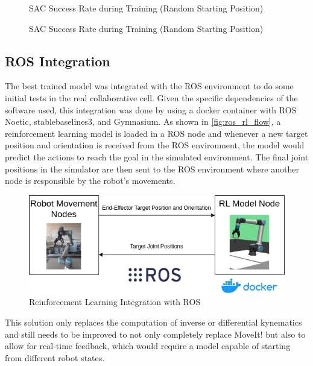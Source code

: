 \begin{figure}[H]%
    \centering
    {\fontsize{8}{11}\selectfont}
    \caption{SAC Success Rate during Training (Random Starting Position)}
    \label{fig:reward_rp}
\end{figure}

\begin{figure}[H]%
    \centering
    {\fontsize{8}{11}\selectfont}
    \caption{SAC Success Rate during Training (Random Starting Position)}
    \label{fig:success_rate_rp}
\end{figure}

\subsection{ROS Integration}

The best trained model was integrated with the ROS environment to do some initial tests in the real collaborative cell. Given the specific dependencies of the software used, this integration was done by using a docker container with ROS Noetic, stablebaselines3, and Gymnasium. As shown in \autoref{fig:ros_rl_flow}, a reinforcement learning model is loaded in a ROS node and whenever a new target position and orientation is received from the ROS environment, the model would predict the actions to reach the goal in the simulated environment. The final joint positions in the simulator are then sent to the ROS environment where another node is responsible by the robot's movements.

\begin{figure}[ht]
    \centerline{\includegraphics[width=\textwidth]{figs/ros_rl_flow.png}}
    \caption{Reinforcement Learning Integration with ROS}
    \label{fig:ros_rl_flow}
\end{figure}

This solution only replaces the computation of inverse or differential kynematics and still needs to be improved to not only completely replace MoveIt! but also to allow for real-time feedback, which would require a model capable of starting from different robot states.
